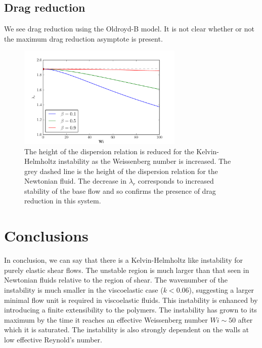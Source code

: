 \documentclass{jfm}
\begin{document}
\subsection{Drag reduction}

We see drag reduction using the Oldroyd-B model. It is not clear whether or not the maximum drag reduction asymptote is present.



\begin{figure}
    \centering
    \includegraphics[width=0.7\textwidth]{KH_high_Re_vary_Wi}
    \caption{The height of the dispersion relation is reduced for the Kelvin-Helmholtz instability as the Weissenberg number is increased. The grey dashed line is the height of the dispersion relation for the Newtonian fluid. The decrease in $\lambda_{r}$ corresponds to increased stability of the base flow and so confirms the presence of drag reduction in this system.}
    \label{fig:KH_drag_reduction}
\end{figure}

\section{Conclusions}

In conclusion, we can say that there is a Kelvin-Helmholtz like instability for purely elastic shear flows. The unstable region is much larger than that seen in Newtonian fluids relative to the region of shear. The wavenumber of the instability is much smaller in the viscoelastic case ($k<0.06$), suggesting a larger minimal flow unit is required in viscoelastic fluids. This instability is enhanced by introducing a finite extensibility to the polymers. The instability has grown to its maximum by the time it reaches an effective Weissenberg number $ Wi \sim 50$ after which it is saturated. The instability is also strongly dependent on the walls at low effective Reynold's number.




%
\end{document}
